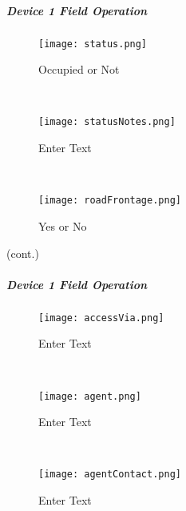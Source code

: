 \clearpage


\subparagraph*{Device 1 Field Operation}
\begin{wrapfigure}{r}{0.4\textwidth}
\centering
    \texttt{[image: status.png]}
\caption {Occupied or Not}
\vspace{.05in}

\HRule \\[.4cm] %
\vspace{.05in}

    \texttt{[image: statusNotes.png]}
\caption{Enter Text}
\vspace{.05in}

\HRule \\[.4cm] %
\vspace{.05in}

    \texttt{[image: roadFrontage.png]}
\caption{Yes or No}
\end{wrapfigure}

{\footnotesize (cont.)}
\vspace{.8in}


\vspace{2.7in}

\vspace{2.5in}

\clearpage
\subparagraph*{Device 1 Field Operation}
\begin{wrapfigure}{r}{0.4\textwidth}
\centering
    \texttt{[image: accessVia.png]}
\caption {Enter Text}
\vspace{.05in}

\HRule \\[.4cm] %
\vspace{.05in}

    \texttt{[image: agent.png]}
\caption{Enter Text}
\vspace{.05in}

\HRule \\[.4cm] %
\vspace{.05in}

    \texttt{[image: agentContact.png]}
\caption{Enter Text}
\end{wrapfigure}

